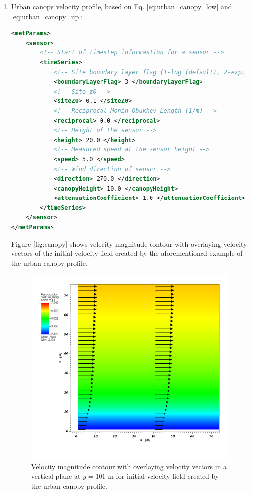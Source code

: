 \begin{enumerate}
\item Urban canopy velocity profile, based on Eq. \ref{eq:urban_canopy_low} and \ref{eq:urban_canopy_up}:

\begin{lstlisting}[language=XML]
<metParams>
	<sensor>
		<!-- Start of timestep informastion for a sensor -->	
		<timeSeries>
			<!-- Site boundary layer flag (1-log (default), 2-exp, 3-urban canopy, 4-data entry) -->						
			<boundaryLayerFlag> 3 </boundaryLayerFlag> 		
			<!-- Site z0 -->
			<siteZ0> 0.1 </siteZ0>
			<!-- Reciprocal Monin-Obukhov Length (1/m) --> 					
			<reciprocal> 0.0 </reciprocal>
			<!-- Height of the sensor --> 				
			<height> 20.0 </height>
			<!-- Measured speed at the sensor height -->			
			<speed> 5.0 </speed>
			<!-- Wind direction of sensor -->				
			<direction> 270.0 </direction> 				
			<canopyHeight> 10.0 </canopyHeight>
			<attenuationCoefficient> 1.0 </attenuationCoefficient>
		</timeSeries>
	</sensor>
</metParams>
\end{lstlisting}

Figure \ref{fig:canopy} shows velocity magnitude contour with overlaying  velocity vectors of the initial velocity field created by the aforementioned example of the urban canopy profile.

\begin{figure}[H]
\includegraphics[width=\textwidth,keepaspectratio]{Images/canopy_y_101.png}
\caption{Velocity magnitude contour with overlaying velocity vectors in a vertical plane at $y=101$ m for initial velocity field created by the urban canopy profile.}
\end{figure}
\noindent


\end{enumerate}
